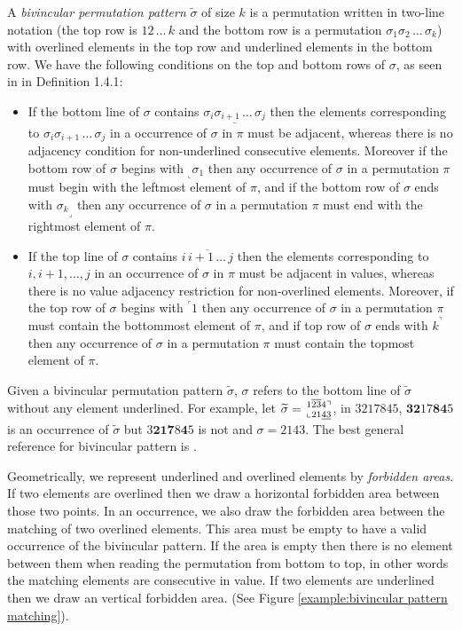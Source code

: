 \documentclass[a4paper]{llncs}
\newcommand\BV[2]{\genfrac{}{}{0pt}{}{#1}{#2}}
\begin{document}
A \emph{bivincular permutation pattern} $\widetilde{\sigma}$
of size $k$ is a permutation written in
two-line notation
(the top row is $12\,\ldots\,k$ and the bottom row
is a permutation $\sigma_1\sigma_2\,\ldots\,\sigma_k$)
with overlined elements in the top row and underlined elements in the bottom row.
We have the following conditions on the top and bottom rows
of $\sigma$, as seen in \cite{Kitaev:book:2011} in Definition 1.4.1:
\begin{itemize}
	\item
	If the bottom line of $\sigma$ contains
	$\underline{\sigma_i\sigma_{i+1}\,\ldots\,\sigma_j}$
	then the elements corresponding to
	$\sigma_i\sigma_{i+1}\,\ldots\,\sigma_j$ in a occurrence of
	$\sigma$ in $\pi$ must be adjacent, whereas there is
	no adjacency condition for
	non-underlined consecutive elements.
	Moreover if the bottom row of $\sigma$ begins with
	$_\llcorner{\sigma_1}$ then any occurrence of $\sigma$
	in a permutation $\pi$ must begin with the leftmost
	element of $\pi$,
	and
	if the bottom row of $\sigma$ ends with
	${\sigma_k}_\lrcorner$ then any occurrence of $\sigma$
	in a permutation $\pi$ must end with the rightmost
	element of $\pi$.
	\item
	If the top line of $\sigma$ contains
	$\overline{i\,i+1\,\ldots\,j}$ then the elements corresponding to
	$i, i+1, \ldots, j$ in an
	occurrence of $\sigma$ in $\pi$ must be adjacent in values,
	whereas there is no value adjacency restriction for non-overlined
	elements.
	Moreover, if the top row of $\sigma$ begins with
	$^\ulcorner{1}$ then
	any occurrence of $\sigma$ in a permutation $\pi$ must contain
	the bottommost element of $\pi$, and
	if top row of $\sigma$ ends with $k^\urcorner$ then
	any occurrence of $\sigma$ in a permutation $\pi$ must contain
	the topmost element of $\pi$.
\end{itemize}

Given a bivincular permutation pattern $\widetilde{\sigma}$,
$\sigma$ refers to the bottom line of $\widetilde{\sigma}$
without any element underlined.
For example,
let
$\widetilde{\sigma} = \BV{1\overline{23}4\urcorner}{\llcorner 21\underline{43}}$,
in $3217845$, $\textbf{32}17\textbf{84}5$ is an occurrence  of $\widetilde{\sigma}$ but $3\textbf{21}\textbf{7}8\textbf{4}5$ is not
and $\sigma = 2143$.
The best general reference for bivincular pattern is \cite{Kitaev:book:2011}.





Geometrically, we represent underlined and overlined elements by \textit{forbidden areas}.
If two elements are overlined then we draw a horizontal forbidden area between those two points.
In an occurrence, we also draw the forbidden area between the matching of two overlined elements.
This area must be empty to have a valid occurrence of the bivincular pattern.
If the area is empty then there is no element between them when reading the permutation
from bottom to top,
in other words the matching elements are consecutive in value.
If two elements are underlined then we draw an vertical forbidden area.
(See Figure \ref{example:bivincular pattern matching}).
\end{document}
